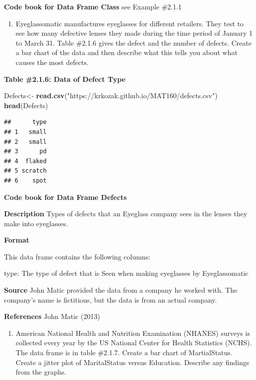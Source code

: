 \documentclass[]{book}
\newenvironment{Shaded}{\begin{snugshade}}{\end{snugshade}}
\newcommand{\KeywordTok}[1]{\textcolor[rgb]{0.13,0.29,0.53}{\textbf{#1}}}
\newcommand{\NormalTok}[1]{#1}
\newcommand{\StringTok}[1]{\textcolor[rgb]{0.31,0.60,0.02}{#1}}
\providecommand{\tightlist}{%
  \setlength{\itemsep}{0pt}\setlength{\parskip}{0pt}}
\begin{document}
\textbf{Code book for Data Frame Class} see Example \#2.1.1

\begin{enumerate}
\def\labelenumi{\arabic{enumi}.}
\setcounter{enumi}{4}
\tightlist
\item
  Eyeglassomatic manufactures eyeglasses for different retailers. They test to see how many defective lenses they made during the time period of January 1 to March 31. Table \#2.1.6 gives the defect and the number of defects. Create a bar chart of the data and then describe what this tells you about what causes the most defects.
\end{enumerate}

\textbf{Table \#2.1.6: Data of Defect Type}

\begin{Shaded}
\begin{Highlighting}[]
\NormalTok{Defects<-}\StringTok{ }\KeywordTok{read.csv}\NormalTok{(}\StringTok{"https://krkozak.github.io/MAT160/defects.csv"}\NormalTok{) }
\KeywordTok{head}\NormalTok{(Defects)}
\end{Highlighting}
\end{Shaded}

\begin{verbatim}
##      type
## 1   small
## 2   small
## 3      pd
## 4  flaked
## 5 scratch
## 6    spot
\end{verbatim}

\textbf{Code book for Data Frame Defects}

\textbf{Description}
Types of defects that an Eyeglass company sees in the lenses they make into eyeglasses.

\textbf{Format}

This data frame contains the following columns:

type: The type of defect that is Seen when making eyeglasses by Eyeglassomatic

\textbf{Source}
John Matic provided the data from a company he worked with. The company's name is fictitious, but the data is from an actual company.

\textbf{References}
John Matic (2013)

\begin{enumerate}
\def\labelenumi{\arabic{enumi}.}
\setcounter{enumi}{5}
\tightlist
\item
  American National Health and Nutrition Examination (NHANES) surveys is collected every year by the US National Center for Health Statistics (NCHS). The data frame is in table \#2.1.7. Create a bar chart of MartialStatus. Create a jitter plot of MaritalStatus versus Education. Describe any findings from the graphs.
\end{enumerate}
\end{document}
